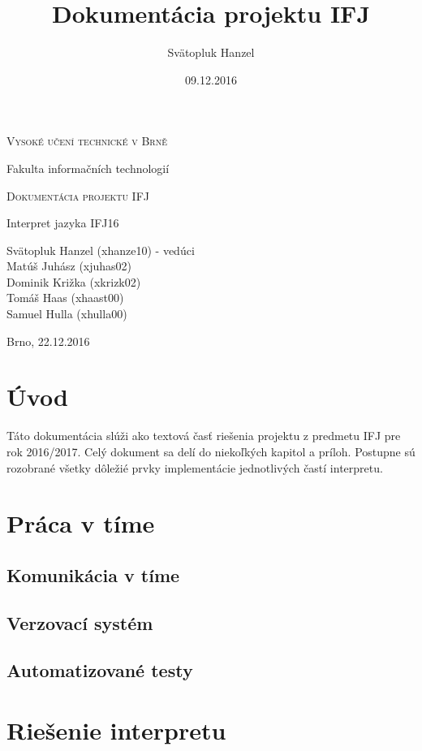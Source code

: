 \documentclass[12pt]{article}
\title{Dokumentácia projektu IFJ}
\author{Svätopluk Hanzel}
\date{09.12.2016}
\begin{document}
	\begin{titlepage}
		\begin{center}
		{\scshape\LARGE Vysoké učení technické v Brně \par}
		{\Large Fakulta informačních technologií\par}


		\vspace{3cm}

		{\scshape\LARGE Dokumentácia projektu IFJ\par}
		{\Large Interpret jazyka IFJ16 \par}


		\vfill

		Svätopluk Hanzel (xhanze10) - vedúci\\
		Matúš Juhász (xjuhas02)\\
		Dominik Križka (xkrizk02)\\
		Tomáš Haas (xhaast00)\\
		Samuel Hulla (xhulla00)\\
		\vspace{1cm}

		{\hfill Brno, 22.12.2016}
	\end{center}
	\end{titlepage}
	\tableofcontents{}
	\newpage

	\section{Úvod}
		Táto dokumentácia slúži ako textová časť riešenia projektu z predmetu IFJ pre rok 2016/2017. Celý dokument sa delí do niekoľkých kapitol a príloh. Postupne sú rozobrané všetky dôležié prvky implementácie jednotlivých častí interpretu.
		\newpage
	\section{Práca v tíme}
        \subsection{Komunikácia v tíme}
        \subsection{Verzovací systém}
        \subsection{Automatizované testy}
	\section{Riešenie interpretu}
\end{document}
